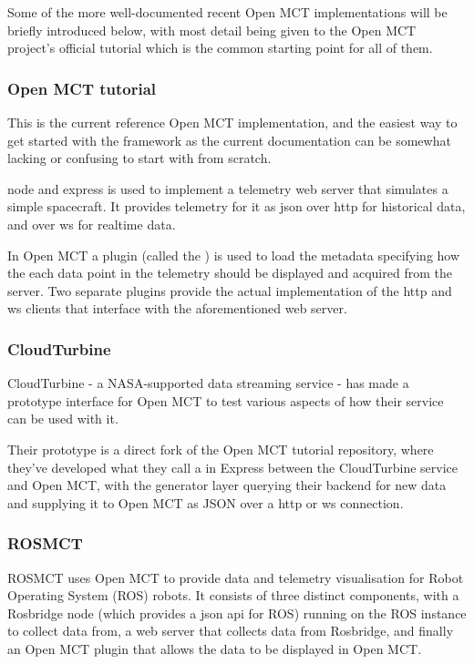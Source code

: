 Some of the more well-documented recent Open MCT implementations will be briefly introduced below, with most detail being given to the Open MCT project's official tutorial which is the common starting point for all of them.

\subsubsection{Open MCT tutorial}
This is the current reference Open MCT implementation, and the easiest way to get started with the framework as the current documentation can be somewhat lacking or confusing to start with from scratch.

\Gls{node} and \Gls{express} is used to implement a telemetry web server that simulates a simple spacecraft. It provides telemetry for it as \acrshort{json} over \acrshort{http} for historical data, and over \Gls{ws} for realtime data.

In Open MCT a plugin (called the ) is used to load the metadata specifying how the each data point in the telemetry should be displayed and acquired from the server. Two separate plugins provide the actual implementation of the \acrshort{http} and \Gls{ws} clients that interface with the aforementioned web server.


\subsubsection{CloudTurbine}
CloudTurbine - a NASA-supported data streaming service - has made a prototype interface for Open MCT to test various aspects of how their service can be used with it.

Their prototype is a direct fork of the Open MCT tutorial repository, where they've developed what they call a  in Express between the CloudTurbine service and Open MCT, with the generator layer querying their backend for new data and supplying it to Open MCT as JSON over a \acrshort{http} or \Gls{ws} connection. \cite{cloudturbine}

\subsubsection{ROSMCT}
ROSMCT uses Open MCT to provide data and telemetry visualisation for Robot Operating System (ROS) robots. It consists of three distinct components, with a Rosbridge node (which provides a \acrshort{json} \acrshort{api} for ROS) running on the ROS instance to collect data from, a web server that collects data from Rosbridge, and finally an Open MCT plugin that allows the data to be displayed in Open MCT.

